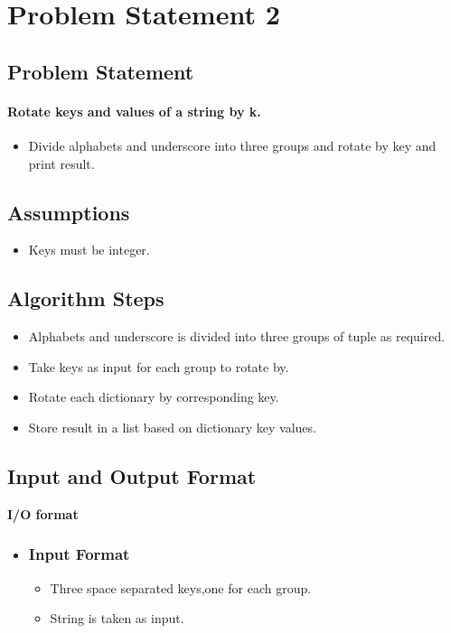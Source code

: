 \documentclass[11pt]{article}
\begin{document}
{{\begin{center}
\end{center}
\newpage
}



\section{Problem Statement 2}
{

\subsection{Problem Statement}
\paragraph{ Rotate keys and values of a string by k.} 
\begin{itemize}
\item Divide alphabets and underscore into three groups and rotate by key and print result.
\end{itemize}
} 

\subsection{Assumptions}
{
\begin{itemize}
\item Keys must be integer.
\end{itemize}
}




\subsection{Algorithm Steps}
{
\begin{itemize}
\item Alphabets and underscore is divided into three groups of tuple as required.
\item Take keys as input for each group to rotate by.
\item Rotate each dictionary by corresponding key.
\item Store result in a list based on dictionary key values.
\end{itemize}

\subsection{Input and Output Format}
{


\textbf{I/O format} 
\begin{itemize}
\item \subsubsection{Input Format}
\begin{itemize}
\item Three space separated keys,one for each group.
\item String is taken as input.
\end{itemize}


\end{itemize}}}}
\end{document}

